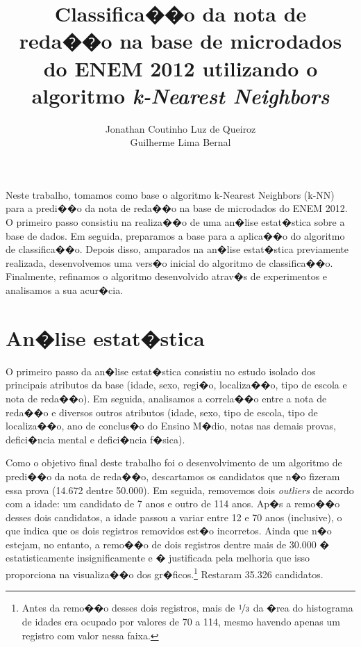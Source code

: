 \documentclass[12pt]{article}
\title{Classifica��o da nota de reda��o na base de microdados do ENEM 2012 utilizando o algoritmo \emph{k-Nearest Neighbors}}
\author{Jonathan Coutinho Luz de Queiroz\inst{1} \\ Guilherme Lima Bernal\inst{1}}
\begin{document}
\maketitle

\begin{resumo}
Neste trabalho, tomamos como base o algoritmo k-Nearest Neighbors (k-NN) para a predi��o da nota de reda��o na base de microdados do ENEM 2012.
O primeiro passo consistiu na realiza��o de uma an�lise estat�stica sobre a base de dados.
Em seguida, preparamos a base para a aplica��o do algoritmo de classifica��o.
Depois disso, amparados na an�lise estat�stica previamente realizada, desenvolvemos uma vers�o inicial do algoritmo de classifica��o.
Finalmente, refinamos o algoritmo desenvolvido atrav�s de experimentos e analisamos a sua acur�cia.
\end{resumo}


\section{An�lise estat�stica}
O primeiro passo da an�lise estat�stica consistiu no estudo isolado dos principais atributos da base (idade, sexo, regi�o, localiza��o, tipo de escola e nota de reda��o).
Em seguida, analisamos a correla��o entre a nota de reda��o e diversos outros atributos (idade, sexo, tipo de escola, tipo de localiza��o, ano de conclus�o do Ensino M�dio, notas nas demais provas, defici�ncia mental e defici�ncia f�sica).

Como o objetivo final deste trabalho foi o desenvolvimento de um algoritmo de predi��o da nota de reda��o, descartamos os candidatos que n�o fizeram essa prova (14.672 dentre 50.000).
Em seguida, removemos dois \emph{outliers} de acordo com a idade: um candidato de 7 anos e outro de 114 anos.
Ap�s a remo��o desses dois candidatos, a idade passou a variar entre 12 e 70 anos (inclusive), o que indica que os dois registros removidos est�o incorretos.
Ainda que n�o estejam, no entanto, a remo��o de dois registros dentre mais de 30.000 � estatisticamente insignificamente e � justificada pela melhoria que isso proporciona na visualiza��o dos gr�ficos.\footnote{Antes da remo��o desses dois registros, mais de $\nicefrac{1}{3}$ da �rea do histograma de idades era ocupado por valores de 70 a 114, mesmo havendo apenas um registro com valor nessa faixa.}
Restaram 35.326 candidatos.
\end{document}
